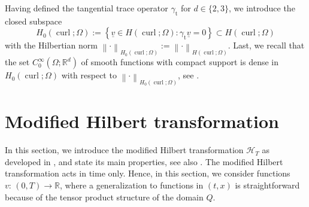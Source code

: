 \documentclass[a4paper,11pt]{article}
\newcommand{\R}{\mathbb R}
\newcommand{\cu}{\operatorname{curl}}
\newcommand{\trt}{\gamma_\mathrm{t}}
\renewcommand{\vec}[1]{\underline{#1}}
\newcommand{\norm}[1]{{\left\lVert{#1}\right\rVert}}
\begin{document}
    Having defined the tangential trace operator $\trt$ for $d \in \{2,3\}$, we introduce the closed subspace
	\begin{equation*}
		H_0(\cu;\Omega) := \left\{ \vec v \in H(\cu;\Omega): \trt \vec v = 0 \right\} \subset H(\cu;\Omega)
	\end{equation*}
	with the Hilbertian norm $\norm{\cdot}_{H_0(\cu;\Omega)} := \norm{\cdot}_{H(\cu;\Omega)}.$ Last, we recall that the set $C_0^\infty(\Omega;\R^d)$ of smooth functions with compact support is dense in $H_0(\cu;\Omega)$ with respect to $\norm{\cdot}_{H_0(\cu;\Omega)}$, see \cite[Theorem~2.12]{GiraultRaviart1986}.
	
	
\section{Modified Hilbert transformation}  \label{Sec:HT}
	
	In this section, we introduce the modified Hilbert transformation
	${\mathcal{H}}_T$ as developed in \cite{SteinbachZankETNA2020, ZankDissBuch2020}, and state its main properties,
	see also \cite{SteinbachMissoni2022, SteinbachZankJNUM2021, ZankCMAM2021, ZankInt2022}. The 
	modified Hilbert transformation acts in time only. Hence, in this section, we consider functions $v \colon \, (0,T) \to \R$, where a generalization to functions in $(t,x)$ is straightforward because of the tensor product structure of the domain $Q$.
	
\end{document}
